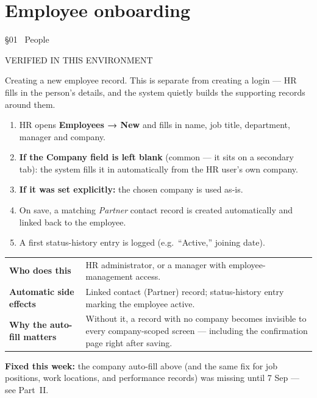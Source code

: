 \documentclass[11pt,a4paper]{article}
\newcommand{\eyebrow}[1]{{\small\ttfamily\color{accentdark} #1}\par\vspace{2pt}}
\begin{document}
\section{Employee onboarding}
\eyebrow{\S01 \textperiodcentered\ People}
\begin{statusbox}{VERIFIED IN THIS ENVIRONMENT}\end{statusbox}

Creating a new employee record. This is separate from creating a login --- HR fills in the person's details, and the system quietly builds the supporting records around them.

\begin{enumerate}[leftmargin=1.8em]
  \item HR opens \textbf{Employees → New} and fills in name, job title, department, manager and company.
  \item \textbf{If the Company field is left blank} (common --- it sits on a secondary tab): the system fills it in automatically from the HR user's own company.
  \item \textbf{If it was set explicitly:} the chosen company is used as-is.
  \item On save, a matching \emph{Partner} contact record is created automatically and linked back to the employee.
  \item A first status-history entry is logged (e.g.\ ``Active,'' joining date).
\end{enumerate}

\begin{center}
\small
\begin{tabular}{@{}p{4cm}p{9.5cm}@{}}
\toprule
\textbf{Who does this} & HR administrator, or a manager with employee-management access. \\
\textbf{Automatic side effects} & Linked contact (Partner) record; status-history entry marking the employee active. \\
\textbf{Why the auto-fill matters} & Without it, a record with no company becomes invisible to every company-scoped screen --- including the confirmation page right after saving. \\
\bottomrule
\end{tabular}
\end{center}

\begin{note}
\textbf{Fixed this week:} the company auto-fill above (and the same fix for job positions, work locations, and performance records) was missing until 7 Sep --- see Part~II.
\end{note}
\end{document}
